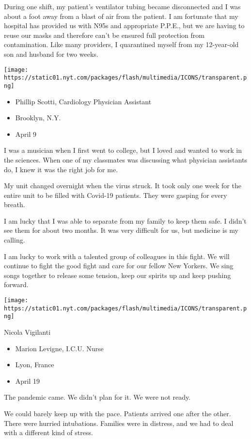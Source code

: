 During one shift, my patient's ventilator tubing became disconnected and
I was about a foot away from a blast of air from the patient. I am
fortunate that my hospital has provided us with N95s and appropriate
P.P.E., but we are having to reuse our masks and therefore can't be
ensured full protection from contamination. Like many providers, I
quarantined myself from my 12-year-old son and husband for two weeks.

\texttt{[image: https://static01.nyt.com/packages/flash/multimedia/ICONS/transparent.png]}

\begin{itemize}
\tightlist
\item
  Phillip Scotti, Cardiology Physician Assistant
\item
  Brooklyn, N.Y.
\item
  April 9
\end{itemize}

I was a musician when I first went to college, but I loved and wanted to
work in the sciences. When one of my classmates was discussing what
physician assistants do, I knew it was the right job for me.

My unit changed overnight when the virus struck. It took only one week
for the entire unit to be filled with Covid-19 patients. They were
gasping for every breath.

I am lucky that I was able to separate from my family to keep them safe.
I didn't see them for about two months. It was very difficult for us,
but medicine is my calling.

I am lucky to work with a talented group of colleagues in this fight. We
will continue to fight the good fight and care for our fellow New
Yorkers. We sing songs together to release some tension, keep our
spirits up and keep pushing forward.

\texttt{[image: https://static01.nyt.com/packages/flash/multimedia/ICONS/transparent.png]}

Nicola Vigilanti

\begin{itemize}
\tightlist
\item
  Marion Levigne, I.C.U. Nurse
\item
  Lyon, France
\item
  April 19
\end{itemize}

The pandemic came. We didn't plan for it. We were not ready.

We could barely keep up with the pace. Patients arrived one after the
other. There were hurried intubations. Families were in distress, and we
had to deal with a different kind of stress.

